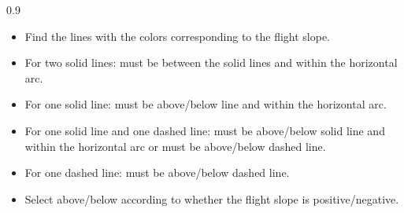 \newcommand{\lowerlimit}[5]{
    \draw [#1,color=#2,very thick] (#4,#5) -- (2*\xmax+#4,(2*\xmax*#3+#5);
}
\newcommand{\upperlimit}[5]{
    \draw [#1,color=#2,very thick] (#4,#5) -- (2*\xmax+#4,(2*\xmax*#3+#5);
}

\newcommand{\combinedarcnote}{
    \begin{tablenote}{0.9\textwidth}\footnotesize
        \begin{itemize}
            \item Find the lines with the colors corresponding to the flight slope.
            \item For two solid lines: must be between the solid lines and within the horizontal arc.
            \item For one solid line: must be above/below line and within the horizontal arc.
            \item For one solid line and one dashed line: must be above/below solid line and within the horizontal arc or must be above/below dashed line.
            \item For one dashed line: must be above/below dashed line.
            \item Select above/below according to whether the flight slope is positive/negative.
        \end{itemize}
    \end{tablenote}
}



\begin{twocolumnfigure}

\combinedarcnote


\end{twocolumnfigure}
\clearpage

